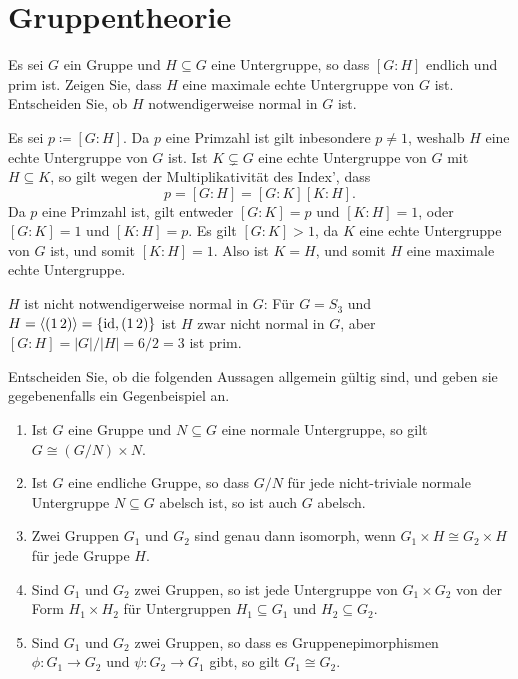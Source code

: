 \section{Gruppentheorie}


\begin{question}[subtitle = Ein Kriterium für maximale Untergruppen]
  Es sei $G$ ein Gruppe und $H \subseteq G$ eine Untergruppe, so dass $[G : H]$ endlich und prim ist.
  Zeigen Sie, dass $H$ eine maximale echte Untergruppe von $G$ ist. Entscheiden Sie, ob $H$ notwendigerweise normal in $G$ ist.
\end{question}


\begin{solution}
  Es sei $p \coloneqq [G : H]$.
  Da $p$ eine Primzahl ist gilt inbesondere $p \neq 1$, weshalb $H$ eine echte Untergruppe von $G$ ist.
  Ist $K \subsetneq G$ eine echte Untergruppe von $G$ mit $H \subseteq K$, so gilt wegen der Multiplikativität des Index’, dass 
  \[
      p
    = [G : H]
    = [G : K] [K : H].
  \]
  Da $p$ eine Primzahl ist, gilt entweder $[G : K] = p$ und $[K : H] = 1$, oder $[G : K] = 1$ und $[K : H] = p$.
  Es gilt $[G : K] > 1$, da $K$ eine echte Untergruppe von $G$ ist, und somit $[K : H] = 1$.
  Also ist $K = H$, und somit $H$ eine maximale echte Untergruppe.
  
  $H$ ist nicht notwendigerweise normal in $G$:
  Für $G = S_3$ und $H = \left\langle (1\,2) \right\rangle = \{\operatorname{id}, (1\,2)\}$ ist $H$ zwar nicht normal in $G$, aber $[G : H] = |G|/|H| = 6/2 = 3$ ist prim.
\end{solution}


\begin{question}[subtitle = Multiple Choice I]
  Entscheiden Sie, ob die folgenden Aussagen allgemein gültig sind, und geben sie gegebenenfalls ein Gegenbeispiel an.
  \begin{enumerate}
    \item
      Ist $G$ eine Gruppe und $N \subseteq G$ eine normale Untergruppe, so gilt $G \cong (G/N) \times N$.
    \item
      Ist $G$ eine endliche Gruppe, so dass $G/N$ für jede nicht-triviale normale Untergruppe $N \subseteq G$ abelsch ist, so ist auch $G$ abelsch.
    \item
      Zwei Gruppen $G_1$ und $G_2$ sind genau dann isomorph, wenn $G_1 \times H \cong G_2 \times H$ für jede Gruppe $H$.
    \item
      Sind $G_1$ und $G_2$ zwei Gruppen, so ist jede Untergruppe von $G_1 \times G_2$ von der Form $H_1 \times H_2$ für Untergruppen $H_1 \subseteq G_1$ und $H_2 \subseteq G_2$.
    \item
      Sind $G_1$ und $G_2$ zwei Gruppen, so dass es Gruppenepimorphismen $\phi \colon G_1 \to G_2$ und $\psi \colon G_2 \to G_1$ gibt, so gilt $G_1 \cong G_2$.
  \end{enumerate}
\end{question}


